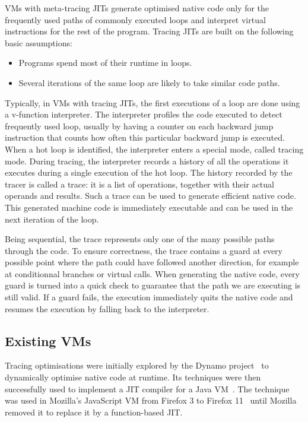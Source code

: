 \documentclass[a4paper,12pt,twoside]{../includes/ThesisStyle}
\begin{document}
VMs with meta-tracing JITs generate optimised native code only for the frequently used paths of commonly executed loops and interpret virtual instructions for the rest of the program. Tracing JITs are built on the following basic assumptions:
\begin{itemize}
	\item Programs spend most of their runtime in loops.
	\item Several iterations of the same loop are likely to take similar code paths.
\end{itemize}

Typically, in VMs with tracing JITs, the first executions of a loop are done using a v-function interpreter. The interpreter profiles the code executed to detect frequently used loop, usually by having a counter on each backward jump instruction that counts how often this particular backward jump is executed. When a hot loop is identified, the interpreter enters a special mode, called tracing mode. During tracing, the interpreter records a history of all the operations it executes during a single execution of the hot loop. The history recorded by the tracer is called a trace: it is a list of operations, together with their actual operands and results. Such a trace can be used to generate efficient native code. This generated machine code is immediately executable and can be used in the next iteration of the loop.

Being sequential, the trace represents only one of the many possible paths through the code. To ensure correctness, the trace contains a guard at every possible point where the path could have followed another direction, for example at conditionnal branches or virtual calls. When generating the native code, every guard is turned into a quick check to guarantee that the path we are executing is still valid. If a guard fails, the execution immediately quits the native code and resumes the execution by falling back to the interpreter.

\subsection{Existing VMs}
\label{sec:existing2}

Tracing optimisations were initially explored by the Dynamo project~\cite{Bala00a} to dynamically optimise native code at runtime. Its techniques were then successfully used to implement a JIT compiler for a Java VM~\cite{Gal06a}. The technique was used in Mozilla's JavaScript VM from Firefox 3 to Firefox 11~\cite{Gal09a} until Mozilla removed it to replace it by a function-based JIT. 
\end{document}
